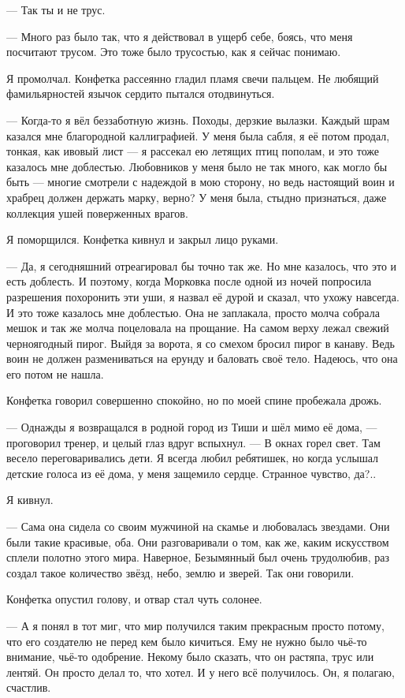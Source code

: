 --- Так ты и не трус.

--- Много раз было так, что я действовал в ущерб себе, боясь, что меня посчитают трусом.
Это тоже было трусостью, как я сейчас понимаю.

Я промолчал.
Конфетка рассеянно гладил пламя свечи пальцем.
Не любящий фамильярностей язычок сердито пытался отодвинуться.

--- Когда-то я вёл беззаботную жизнь.
Походы, дерзкие вылазки.
Каждый шрам казался мне благородной каллиграфией.
У меня была сабля, я её потом продал, тонкая, как ивовый лист --- я рассекал ею летящих птиц пополам, и это тоже казалось мне доблестью.
Любовников у меня было не так много, как могло бы быть --- многие смотрели с надеждой в мою сторону, но ведь настоящий воин и храбрец должен держать марку, верно?
У меня была, стыдно признаться, даже коллекция ушей поверженных врагов.

Я поморщился.
Конфетка кивнул и закрыл лицо руками.

--- Да, я сегодняшний отреагировал бы точно так же.
Но мне казалось, что это и есть доблесть.
И поэтому, когда Морковка после одной из ночей попросила разрешения похоронить эти уши, я назвал её дурой и сказал, что ухожу навсегда.
И это тоже казалось мне доблестью.
Она не заплакала, просто молча собрала мешок и так же молча поцеловала на прощание.
На самом верху лежал свежий черноягодный пирог.
Выйдя за ворота, я со смехом бросил пирог в канаву.
Ведь воин не должен размениваться на ерунду и баловать своё тело.
Надеюсь, что она его потом не нашла.

Конфетка говорил совершенно спокойно, но по моей спине пробежала дрожь.

--- Однажды я возвращался в родной город из Тиши и шёл мимо её дома, --- проговорил тренер, и целый глаз вдруг вспыхнул.
--- В окнах горел свет.
Там весело переговаривались дети.
Я всегда любил ребятишек, но когда услышал детские голоса из её дома, у меня защемило сердце.
Странное чувство, да?..

Я кивнул.

--- Сама она сидела со своим мужчиной на скамье и любовалась звездами.
Они были такие красивые, оба.
Они разговаривали о том, как же, каким искусством сплели полотно этого мира.
Наверное, Безымянный был очень трудолюбив, раз создал такое количество звёзд, небо, землю и зверей.
Так они говорили.

Конфетка опустил голову, и отвар стал чуть солонее.

--- А я понял в тот миг, что мир получился таким прекрасным просто потому, что его создателю не перед кем было кичиться.
Ему не нужно было чьё-то внимание, чьё-то одобрение.
Некому было сказать, что он растяпа, трус или лентяй.
Он просто делал то, что хотел.
И у него всё получилось.
Он, я полагаю, счастлив.

